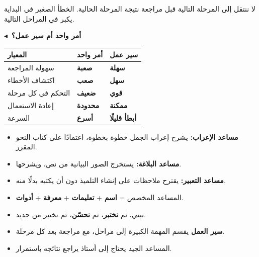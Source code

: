 \documentclass[a4paper]{article}
\newcommand{\far}[1]{\par\smallskip
    {\color{dakin}\khatt\bfseries {\color{asasi}$\blacktriangleleft$}\ #1}\par\nopagebreak[4]}
\newcommand{\kalima}[2][]{\textbf{#2}}
\newcommand{\ras}[1]{\cellcolor{black!7}\color{dakin}\bfseries #1}
\begin{document}
\begin{intabih}
لا ننتقل إلى المرحلة التالية قبل مراجعة نتيجة المرحلة الحالية.
الخطأ الصغير في البداية يكبر في المراحل التالية.
\end{intabih}

\far{أمر واحد أم سير عمل؟}

\begin{center}
\begin{tabular}{>{\raggedleft\arraybackslash}m{5cm}
                >{\centering\arraybackslash}m{4cm}
                >{\centering\arraybackslash}m{4cm}}
\hline
\ras{المعيار} & \ras{أمر واحد} & \ras{سير عمل} \\
\hline
سهولة المراجعة         & \kalima[ahmar]{صعبة}   & \kalima[akhdar]{سهلة} \\ \hline
اكتشاف الأخطاء         & \kalima[ahmar]{صعب}    & \kalima[akhdar]{سهل} \\ \hline
التحكم في كل مرحلة     & \kalima[ahmar]{ضعيف}   & \kalima[akhdar]{قوي} \\ \hline
إعادة الاستعمال        & \kalima[burtuqali]{محدودة} & \kalima[akhdar]{ممكنة} \\ \hline
السرعة                 & \kalima[akhdar]{أسرع}  & \kalima[burtuqali]{أبطأ قليلًا} \\ \hline
\end{tabular}
\end{center}

\begin{arabiyya}
\begin{itemize}
    \item \textbf{مساعد الإعراب:} يشرح إعراب الجمل خطوة بخطوة، اعتمادًا على كتاب النحو المقرر.
    \item \textbf{مساعد البلاغة:} يستخرج الصور البيانية من نص، ويشرحها.
    \item \textbf{مساعد التعبير:} يقترح ملاحظات على إنشاء التلميذ دون أن يكتبه بدلًا منه.
\end{itemize}
\end{arabiyya}

\begin{khulasa}
\begin{itemize}
    \item المساعد المخصص = \textbf{اسم} + \textbf{تعليمات} + \textbf{معرفة} + \textbf{أدوات}.
    \item نبني، ثم \textbf{نختبر}، ثم \textbf{نحسّن}، ثم نختبر من جديد.
    \item \textbf{سير العمل} يقسم المهمة الكبيرة إلى مراحل، مع مراجعة بعد كل مرحلة.
    \item المساعد الجيد يحتاج إلى أستاذ يراجع نتائجه باستمرار.
\end{itemize}
\end{khulasa}
\end{document}
